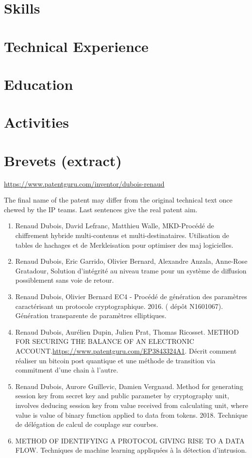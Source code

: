 \documentclass[letter,10pt]{article}
\begin{document}


\section{Skills}


\section{Technical Experience}


\section{Education}



\section{Activities}

 
\section{Brevets (extract)}
\url{https://www.patentguru.com/inventor/dubois-renaud}

The final name of the patent may differ from the original technical text once chewed by the IP teams. Last sentences give the real patent aim.
 \begin{enumerate}
  \item  Renaud Dubois, David Lefranc, Matthieu Walle, MKD-Procédé de chiffrement hybride multi-contenus et multi-destinataires. Utilisation de tables de hachages et de Merkleisation pour optimiser des maj logicielles. 
  \item Renaud Dubois, Eric Garrido, Olivier Bernard, Alexandre Anzala, Anne-Rose Gratadour, Solution d'intégrité au niveau trame pour un système de diffusion possiblement sans voie de retour.
  \item Renaud Dubois, Olivier Bernard EC4 - Procédé de génération des paramètres caractérisant un protocole cryptographique. 2016. ( dépôt N1601067). Génération transparente de paramètres elliptiques.
 \item Renaud Dubois, Aurélien Dupin, Julien Prat, Thomas Ricosset. METHOD FOR SECURING THE BALANCE OF AN ELECTRONIC ACCOUNT.\url{https://www.patentguru.com/EP3843324A1}. Décrit comment réaliser un bitcoin post quantique et une méthode de transition via commitment d'une chain à l'autre.
 \item Renaud Dubois, Aurore Guillevic, Damien Vergnaud. Method for generating session key from secret key and public parameter by cryptography unit, involves deducing session key from value received from calculating unit, where value is value of binary function applied to data from tokens. 2018. Technique de délégation de calcul de couplage sur courbes.
 \item  METHOD OF IDENTIFYING A PROTOCOL GIVING RISE TO A DATA FLOW. Techniques de machine learning appliquées à la détection d'intrusion.
 \end{enumerate}  
  
\end{document}
